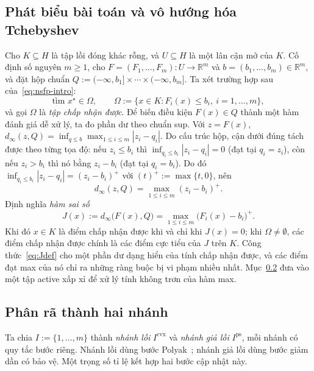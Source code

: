 \documentclass[]{interact}
\theoremstyle{plain}
\theoremstyle{definition}
\theoremstyle{remark}
\newcommand{\R}{\mathbb{R}}
\newcommand{\abs}[1]{\left\lvert #1 \right\rvert}
\newcommand{\cvx}{\mathrm{cvx}}
\newcommand{\ps}{\mathrm{ps}}
\begin{document}
\subsection{Phát biểu bài toán và vô hướng hóa Tchebyshev}\label{ssec:model-stmt}
Cho $K\subseteq H$ là tập lồi đóng khác rỗng, và $U\subseteq H$ là một lân cận mở
của $K$. Cố định số nguyên $m\ge1$, cho $F=(F_1,\dots,F_m):U\to\R^m$ và
$b=(b_1,\dots,b_m)\in\R^m$, và đặt hộp chuẩn
$Q:=(-\infty,b_1]\times\cdots\times(-\infty,b_m]$. Ta xét trường hợp sau
của~\eqref{eq:nsfp-intro}:
\begin{equation}\label{eq:nsfp-box}
\text{tìm } x^\star\in\Omega,\qquad
\Omega:=\bigl\{x\in K: F_i(x)\le b_i,\ i=1,\dots,m\bigr\},
\end{equation}
và gọi $\Omega$ là \emph{tập chấp nhận được}. Để biến điều kiện $F(x)\in Q$ thành một hàm đánh giá
dễ xử lý, ta đo phần dư theo chuẩn sup. Với $z=F(x)$,
$d_\infty(z,Q)=\inf_{q\le b}\max_{1\le i\le m}\abs{z_i-q_i}$. Do cấu trúc hộp,
cận dưới đúng tách được theo từng tọa độ: nếu $z_i\le b_i$ thì
$\inf_{q_i\le b_i}\abs{z_i-q_i}=0$ (đạt tại $q_i=z_i$), còn nếu $z_i>b_i$ thì nó bằng
$z_i-b_i$ (đạt tại $q_i=b_i$). Do đó $\inf_{q_i\le b_i}\abs{z_i-q_i}=(z_i-b_i)^+$ với
$(t)^+:=\max\{t,0\}$, nên
\begin{equation}\label{eq:dinfty}
d_\infty(z,Q)=\max_{1\le i\le m}(z_i-b_i)^+ .
\end{equation}
Định nghĩa \emph{hàm sai số}
\begin{equation}\label{eq:Jdef}
J(x):=d_\infty\bigl(F(x),Q\bigr)=\max_{1\le i\le m}\bigl(F_i(x)-b_i\bigr)^+ .
\end{equation}
Khi đó $x\in K$ là điểm chấp nhận được khi và chỉ khi $J(x)=0$; khi $\Omega\ne\emptyset$, các điểm
chấp nhận được chính là các điểm cực tiểu của $J$ trên $K$. Công thức~\eqref{eq:Jdef} cho một phần dư dạng hiển của tính chấp nhận được, và các điểm
đạt max của nó chỉ ra những ràng buộc bị vi phạm nhiều nhất. Mục~\ref{ssec:dual-track}
đưa vào một tập active xấp xỉ để xử lý tính không trơn của hàm max.

\subsection{Phân rã thành hai nhánh}\label{ssec:dual-track}
Ta chia $I:=\{1,\dots,m\}$ thành \emph{nhánh lồi} $I^{\cvx}$ và
\emph{nhánh giả lồi} $I^{\ps}$, mỗi nhánh có quy tắc bước riêng. Nhánh lồi dùng bước Polyak~\citep{polyak1969};
nhánh giả lồi dùng bước giảm dần có bảo vệ.
Một trọng số tỉ lệ kết hợp hai bước cập nhật này.
\end{document}
